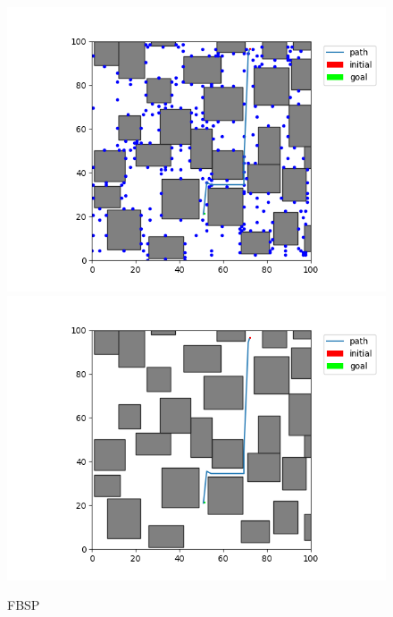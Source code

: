\documentclass[12pt,a4paper]{article}
\begin{document}
\begin{figure}[H]
\centering
	\includegraphics[scale=.40]{30_20_fbsp_state}
    \includegraphics[scale=.40]{30_20_fbsp_path}
\caption{FBSP}
\end{figure}

\newpage
\end{document}
